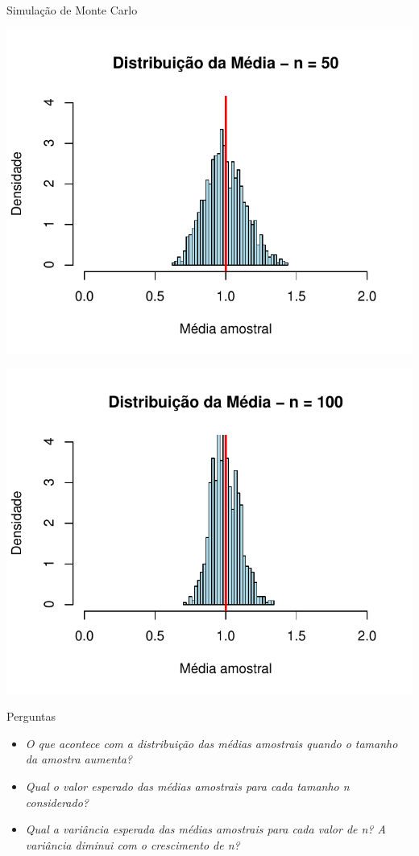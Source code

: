 \documentclass[aspectratio=169,14pt]{beamer}
\begin{document}
\begin{frame}{Simulação de Monte Carlo}
\begin{minipage}{0.31\textwidth}
        \includegraphics[width=\linewidth]{hist/hist_exp_n50.pdf}
    \end{minipage}
    \begin{minipage}{0.31\textwidth}
        \includegraphics[width=\linewidth]{hist/hist_exp_n100.pdf}
    \end{minipage}
\end{frame}

\begin{frame}{Perguntas}
    \begin{itemize}
        \item \textit{O que acontece com a distribuição das médias amostrais
        quando o tamanho da amostra aumenta?}
        \item \textit{Qual o valor esperado das médias amostrais para cada
        tamanho n considerado?}
        \item \textit{Qual a variância esperada das médias amostrais para cada
        valor de n? A variância diminui com o crescimento de n?}
    \end{itemize}
\end{frame}
\end{document}
